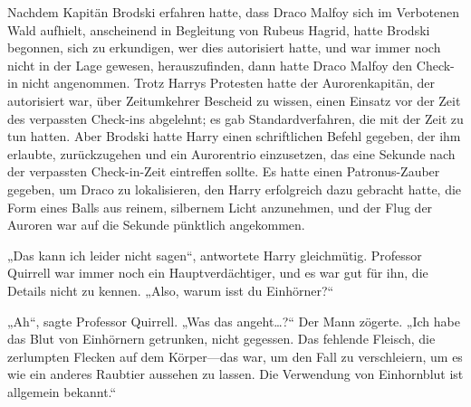 Nachdem Kapitän Brodski erfahren hatte, dass Draco Malfoy sich im Verbotenen Wald aufhielt, anscheinend in Begleitung von Rubeus Hagrid, hatte Brodski begonnen, sich zu erkundigen, wer dies autorisiert hatte, und war immer noch nicht in der Lage gewesen, herauszufinden, dann hatte Draco Malfoy den Check-in nicht angenommen. Trotz Harrys Protesten hatte der Aurorenkapitän, der autorisiert war, über Zeitumkehrer Bescheid zu wissen, einen Einsatz vor der Zeit des verpassten Check-ins abgelehnt; es gab Standardverfahren, die mit der Zeit zu tun hatten. Aber Brodski hatte Harry einen schriftlichen Befehl gegeben, der ihm erlaubte, zurückzugehen und ein Aurorentrio einzusetzen, das eine Sekunde nach der verpassten Check-in-Zeit eintreffen sollte. Es hatte einen Patronus-Zauber gegeben, um Draco zu lokalisieren, den Harry erfolgreich dazu gebracht hatte, die Form eines Balls aus reinem, silbernem Licht anzunehmen, und der Flug der Auroren war auf die Sekunde pünktlich angekommen.

„Das kann ich leider nicht sagen“, antwortete Harry gleichmütig. Professor Quirrell war immer noch ein Hauptverdächtiger, und es war gut für ihn, die Details nicht zu kennen. „Also, warum isst du Einhörner?“

„Ah“, sagte Professor Quirrell. „Was das angeht…?“ Der Mann zögerte. „Ich habe das Blut von Einhörnern getrunken, nicht gegessen. Das fehlende Fleisch, die zerlumpten Flecken auf dem Körper—das war, um den Fall zu verschleiern, um es wie ein anderes Raubtier aussehen zu lassen. Die Verwendung von Einhornblut ist allgemein bekannt.“

